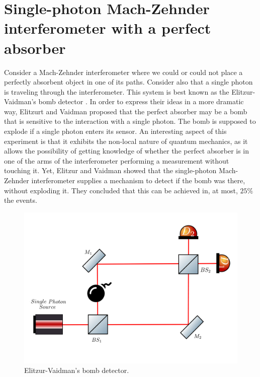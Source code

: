 \documentclass[12pt]{book}
\begin{document}
\section[Elitzur-Vaidman's bomb detector]{Single-photon Mach-Zehnder interferometer with a perfect absorber}

Consider a Mach-Zehnder interferometer where we could or could not place a perfectly absorbent object in one of its paths. Consider also that a single photon is traveling through the interferometer. This system is best known as the Elitzur-Vaidman's bomb detector \cite{Elitzur}. In order to express their ideas in a more dramatic way, Elitzurt and Vaidman proposed that the perfect absorber may be a bomb that is sensitive to the interaction with a single photon. The bomb is supposed to explode if  a single photon enters its sensor. An interesting aspect of this experiment is that it exhibits the non-local nature of quantum mechanics, as it allows the possibility of getting knowledge of whether the perfect absorber is in one of the arms of the interferometer performing a measurement without touching it. Yet, Elitzur and Vaidman showed that the single-photon Mach-Zehnder interferometer supplies a mechanism to detect if the bomb was there, without exploding it. They concluded that this can be achieved in, at most, $25\%$ the events.


\begin{figure}[t!]
\centering
\includegraphics[width=\linewidth]{images/machzenhderbomb.png}
\caption{Elitzur-Vaidman's bomb detector.}
\label{fig:bomb}
\end{figure}
\end{document}

